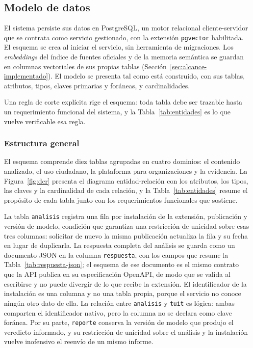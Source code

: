 \subsection{Modelo de datos}
\label{sec:modelo-datos}

El sistema persiste sus datos en PostgreSQL, un motor relacional cliente-servidor que se contrata como servicio gestionado, con la extensión \texttt{pgvector} habilitada. El esquema se crea al iniciar el servicio, sin herramienta de migraciones. Los \textit{embeddings} del índice de fuentes oficiales y de la memoria semántica se guardan en columnas vectoriales de sus propias tablas (Sección~\ref{sec:alcance-implementado}). El modelo se presenta tal como está construido, con sus tablas, atributos, tipos, claves primarias y foráneas, y cardinalidades.

Una regla de corte explícita rige el esquema: toda tabla debe ser trazable hasta un requerimiento funcional del sistema, y la Tabla~\ref{tab:entidades} es lo que vuelve verificable esa regla.

\subsubsection{Estructura general}

El esquema comprende diez tablas agrupadas en cuatro dominios: el contenido analizado, el uso ciudadano, la plataforma para organizaciones y la evidencia. La Figura~\ref{fig:der} presenta el diagrama entidad-relación con los atributos, los tipos, las claves y la cardinalidad de cada relación, y la Tabla~\ref{tab:entidades} resume el propósito de cada tabla junto con los requerimientos funcionales que sostiene.

La tabla \texttt{analisis} registra una fila por instalación de la extensión, publicación y versión de modelo, condición que garantiza una restricción de unicidad sobre esas tres columnas: solicitar de nuevo la misma publicación actualiza la fila y su fecha en lugar de duplicarla. La respuesta completa del análisis se guarda como un documento JSON en la columna \texttt{respuesta}, con los campos que resume la Tabla~\ref{tab:respuesta-json}; el esquema de ese documento es el mismo contrato que la API publica en su especificación OpenAPI, de modo que se valida al escribirse y no puede divergir de lo que recibe la extensión. El identificador de la instalación es una columna y no una tabla propia, porque el servicio no conoce ningún otro dato de ella. La relación entre \texttt{analisis} y \texttt{tuit} es lógica: ambas comparten el identificador nativo, pero la columna no se declara como clave foránea. Por su parte, \texttt{reporte} conserva la versión de modelo que produjo el veredicto informado, y su restricción de unicidad sobre el análisis y la instalación vuelve inofensivo el reenvío de un mismo informe.

